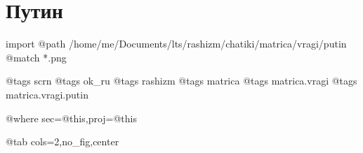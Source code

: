  
 
 
 
 

\section{Путин}

\ifcmt
  import
    @path /home/me/Documents/lts/rashizm/chatiki/matrica/vragi/putin
    @match *.png

    @tags scrn
    @tags ok_ru
    @tags rashizm
    @tags matrica
    @tags matrica.vragi
    @tags matrica.vragi.putin

    @where sec=@this,proj=@this
  
    @tab cols=2,no_fig,center
\fi
